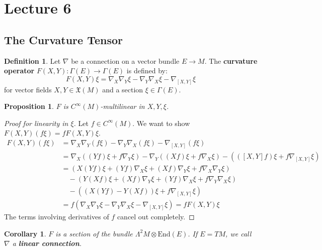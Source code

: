 \documentclass[11pt, a4paper]{article}
\theoremstyle{plain}
\newtheorem{proposition}[theorem]{Proposition}
\newtheorem{corollary}[theorem]{Corollary}
\theoremstyle{definition}
\newtheorem{definition}[theorem]{Definition}
\theoremstyle{remark}
\begin{document}
\section{Lecture 6}

\subsection{The Curvature Tensor}

\begin{definition}
Let $\nabla$ be a connection on a vector bundle $E \to M$. The \textbf{curvature operator} $F(X, Y): \Gamma(E) \to \Gamma(E)$ is defined by:
\[ F(X, Y)\xi = \nabla_X \nabla_Y \xi - \nabla_Y \nabla_X \xi - \nabla_{[X, Y]} \xi \]
for vector fields $X, Y \in \mathfrak{X}(M)$ and a section $\xi \in \Gamma(E)$. 
\end{definition}

\begin{proposition}
$F$ is $C^\infty(M)$-multilinear in $X, Y, \xi$.
\end{proposition}
\begin{proof}[Proof for linearity in $\xi$]
Let $f \in C^\infty(M)$. We want to show $F(X, Y)(f\xi) = f F(X, Y)\xi$.
\begin{align*}
    F(X, Y)(f\xi) &= \nabla_X \nabla_Y (f\xi) - \nabla_Y \nabla_X (f\xi) - \nabla_{[X, Y]}(f\xi) \\
    &= \nabla_X \left( (Yf)\xi + f\nabla_Y \xi \right) - \nabla_Y \left( (Xf)\xi + f\nabla_X \xi \right) - \left( ([X, Y]f)\xi + f\nabla_{[X, Y]}\xi \right) \\
    &= \left( X(Yf)\xi + (Yf)\nabla_X \xi + (Xf)\nabla_Y \xi + f\nabla_X \nabla_Y \xi \right) \\
    &\quad - \left( Y(Xf)\xi + (Xf)\nabla_Y \xi + (Yf)\nabla_X \xi + f\nabla_Y \nabla_X \xi \right) \\
    &\quad - \left( (X(Yf) - Y(Xf))\xi + f\nabla_{[X, Y]}\xi \right) \\
    &= f \left( \nabla_X \nabla_Y \xi - \nabla_Y \nabla_X \xi - \nabla_{[X, Y]} \xi \right) = f F(X, Y)\xi
\end{align*}
The terms involving derivatives of $f$ cancel out completely.
\end{proof}

\begin{corollary}
$F$ is a section of the bundle $\Lambda^2 M \otimes \text{End}(E)$. If $E = TM$, we call $\nabla$ a \textbf{linear connection}.
\end{corollary}
\end{document}
